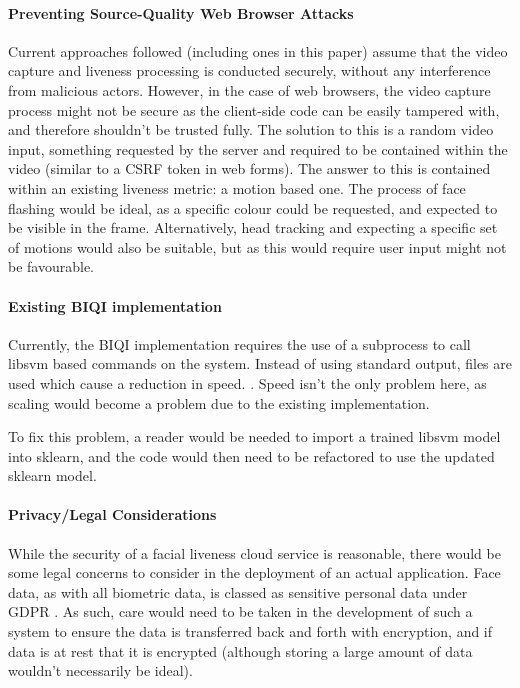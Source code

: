 \documentclass[10pt,a4paper]{article}
\begin{document}
        \paragraph{Preventing Source-Quality Web Browser Attacks}
        Current approaches followed (including ones in this paper) assume that the video capture and liveness processing is conducted securely, 
        without any interference from malicious actors. However, in the case of web browsers, the video capture process might not be secure as
        the client-side code can be easily tampered with, and therefore shouldn't be trusted fully. The solution to this is a random video input,
        something requested by the server and required to be contained within the video (similar to a CSRF token in web forms). The answer to this
        is contained within an existing liveness metric: a motion based one. The process of face flashing would be ideal, as a specific colour could
        be requested, and expected to be visible in the frame. Alternatively, head tracking and expecting a specific set of motions would also be suitable,
        but as this would require user input might not be favourable.

        
        \paragraph{Existing BIQI implementation}
        Currently, the BIQI implementation requires the use of a subprocess to call libsvm based commands on the system. Instead of using standard output, files are used which
        cause a reduction in speed.
        .
        Speed isn't the only problem here, as scaling would become a problem due to the existing implementation. 

        To fix this problem, a reader would be needed to import a trained libsvm model into sklearn, and the code would then need to be refactored to use the updated sklearn model. 

        \paragraph{Privacy/Legal Considerations}
            While the security of a facial liveness cloud service is reasonable, there would be some legal concerns to consider in the deployment of an actual application.
            Face data, as with all biometric data, is classed as sensitive personal data under GDPR . As such, care would need to be taken in the development of such a system
            to ensure the data is transferred back and forth with encryption, and if data is at rest that it is encrypted (although storing a large amount of data wouldn't necessarily be ideal).
\end{document}
